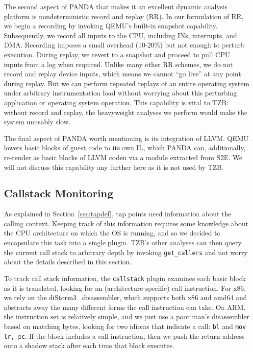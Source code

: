 The second aspect of PANDA that makes it an excellent dynamic analysis
platform is nondeterministic record and replay (RR). In our formulation
of RR, we begin a recording by invoking QEMU's built-in snapshot
capability. Subsequently, we record all inputs to the CPU, including
INs, interrupts, and DMA. Recording imposes a small overhead (10-20\%)
but not enough to perturb execution. During replay, we revert to a
snapshot and proceed to pull CPU inputs from a log when required.
Unlike many other RR schemes, we do not record and replay device inputs,
which means we cannot ``go live'' at any point during replay. But we
can perform repeated replays of an entire operating system under
arbitrary instrumentation load without worrying about this perturbing
application or operating system operation. This capability is vital to
TZB: without record and replay, the heavyweight analyses we perform
would make the system unusably slow.

The final aspect of PANDA worth mentioning is its integration of LLVM.
QEMU lowers basic blocks of guest code to its own IL, which PANDA can,
additionally, re-render as basic blocks of LLVM coden via a module 
extracted from S2E. We will not discuss this capability any further 
here as it is not used by TZB.


\subsection{Callstack Monitoring}
\label{sec:implementation:subsec:callstack}

As explained in Section~\ref{sec:tapdef}, tap points need information
about the calling context. Keeping track of this information requires
some knowledge about the CPU architecture on which the OS is running,
and so we decided to encapsulate this task into a single plugin. TZB's
other analyses can then query the current call stack to arbitrary depth
by invoking \texttt{get\_callers} and not worry about the details
described in this section.

To track call stack information, the \texttt{callstack} plugin examines
each basic block as it is translated, looking for an
(architecture-specific) call instruction. For x86, we rely on the
diStorm3~\cite{distorm} disassembler, which supports both x86 and amd64
and abstracts away the many different forms the call instruction can
take. On ARM, the instruction set is relatively simple, and we just use
a poor man's disassembler based on matching bytes, looking for two
idioms that indicate a call: \texttt{bl} and \texttt{mov lr, pc}. If the
block includes a call instruction, then we push the return address onto
a shadow stack after each time that block executes.

